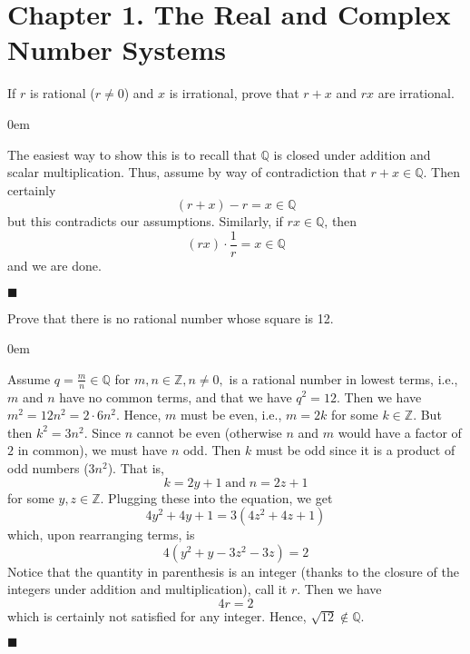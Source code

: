 \documentclass[12pt]{article}
\renewcommand{\qed}{\hfill$\blacksquare$}
\renewenvironment{proof}{\begin{addmargin}[1em]{0em}\begin{newproof}}{\end{newproof}\end{addmargin}\qed}
\newenvironment{problem}[2][Exercise]{\begin{trivlist}
\item[\hskip \labelsep {\bfseries #1}\hskip \labelsep {\bfseries #2.}]}{\end{trivlist}}
\begin{document}

\rhead{\today}

\section*{Chapter 1. The Real and Complex Number Systems}

\begin{problem}{1.1}
If $r$ is rational ($r\neq0$) and $x$ is irrational, prove that $r+x$ and $rx$ are irrational.
\end{problem}
\begin{proof}
The easiest way to show this is to recall that $\mathbb{Q}$ is closed under addition and scalar multiplication. Thus, assume by way of contradiction that $r+x\in \mathbb{Q}$. Then certainly $$ \left(r+x\right)-r = x \in \mathbb{Q}$$ but this contradicts our assumptions. Similarly, if $rx\in\mathbb{Q}$, then $$ \left(rx\right) \cdot \frac{1}{r} = x \in \mathbb{Q}$$ and we are done.
\end{proof}


\begin{problem}{1.2}
Prove that there is no rational number whose square is 12.
\end{problem}
\begin{proof}
Assume $q = \frac{m}{n} \in\mathbb{Q}$ for $m,n \in \mathbb{Z}, n \neq 0,$ is a rational number in lowest terms, i.e., $m$ and $n$ have no common terms, and that we have $q^2 = 12$. Then we have $m^2 = 12 n^2 = 2 \cdot 6n^2$. Hence, $m$ must be even, i.e., $m=2k$ for some $k\in \mathbb{Z}$. But then $k^2 = 3n^2$. Since $n$ cannot be even (otherwise $n$ and $m$ would have a factor of $2$ in common), we must have $n$ odd. Then $k$ must be odd since it is a product of odd numbers ($3n^2$). That is, $$ k =2y+1 \; \text{and} \; n = 2z+1$$ for some $y,z\in\mathbb{Z}$. Plugging these into the equation, we get $$ 4y^2 + 4y + 1 = 3\left(4z^2 + 4z + 1\right) $$ which, upon rearranging terms, is $$ 4\left(y^2 + y -3z^2 - 3z\right) = 2 $$ Notice that the quantity in parenthesis is an integer (thanks to the closure of the integers under addition and multiplication), call it $r$. Then we have $$ 4r = 2$$ which is certainly not satisfied for any integer. Hence, $\sqrt{12}\notin \mathbb{Q}$.
\end{proof}
\end{document}
